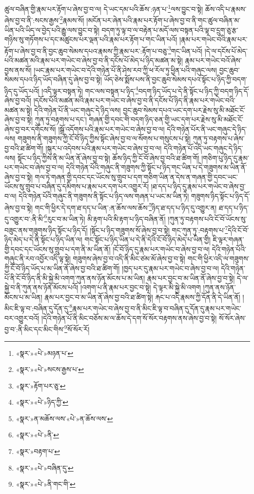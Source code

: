 ཚུལ་བཞིན་གྱི་རྣམ་པར་རྟོག་པ་ཞེས་བྱ་བ་ལ། དེ་ཡང་དམ་པའི་ཆོས་:ཉན་པ་\footnote{«སྣར་»«པེ་»མཉན་པ་}ལས་བྱུང་བ་སྟེ། ཆོས་འདི་པ་རྣམས་ཞེས་བྱ་བ་ནི་:སངས་རྒྱས་\footnote{«སྣར་»«པེ་»སངས་རྒྱས་པ་}རྣམས་སོ། །མངོན་པར་ཞེན་པའི་རྣམ་པར་རྟོག་པ་ཞེས་བྱ་བ་ནི་གང་ཚུལ་བཞིན་མ་ཡིན་པའི་ཡིད་ལ་བྱེད་པའི་རྒྱུ་ལས་བྱུང་བ་སྟེ། བདག་ཏུ་ལྟ་བ་ལ་བརྟེན་པ་མདོ་ལས་བསྟན་པའི་ལྟ་བ་དྲུག་ཅུ་རྩ་གཉིས་སུ་གཏོགས་པ་དང་མཚུངས་པར་ལྡན་པའི་རྣམ་པར་རྟོག་པ་གང་ཡིན་པའོ། །རྣམ་པར་གཡེང་བའི་རྣམ་པར་རྟོག་པ་ཞེས་བྱ་བ་ནི་བྱང་ཆུབ་སེམས་དཔའ་རྣམས་ཀྱི་རྣམ་པར་:རྟོག་པ་བཅུ་\footnote{«སྣར་»རྟོག་པར་ཅུ་}གང་ཡིན་པའོ། །དེ་ལ་དངོས་པོ་མེད་པའི་མཚན་མའི་རྣམ་པར་གཡེང་བ་ཞེས་བྱ་བ་ནི་དངོས་པོ་མེད་པ་ཉིད་མཚན་མ་སྟེ། རྣམ་པར་གཡེང་བའོ་ཞེས་བྱས་ནས་སོ། །ཡང་རྣམ་པར་གཡེང་བ་དེའི་གཉེན་པོ་ནི་ཤེས་རབ་ཀྱི་ཕ་རོལ་ཏུ་ཕྱིན་པའི་གཞུང་ལས། བྱང་ཆུབ་སེམས་དཔའ་ཉིད་ཡོད་བཞིན་དུ་ཞེས་བྱ་བ་སྟེ། ཡོད་ཅེས་སྨོས་པས་ནི་བྱང་ཆུབ་སེམས་དཔའ་སྟོང་པ་ཉིད་ཀྱི་བདག་ཉིད་དུ་ཡོད་པའོ། །འདི་ལྟར་བསྟན་ཏེ། གང་ལས་བསྟན་པ་ཉིད་\footnote{«སྣར་»«པེ་»ཉིད་ཀྱི་}བདག་ཉིད་ཡོད་པ་དེ་ནི་སྟོང་པ་ཉིད་ཀྱི་བདག་ཉིད་དོ་ཞེས་བྱ་བའོ། །དངོས་པོའི་མཚན་མའི་རྣམ་པར་གཡེང་བ་ཞེས་བྱ་བ་ནི་དངོས་པོ་ཉིད་ནི་རྣམ་པར་གཡེང་བའི་མཚན་མ་སྟེ། དེའི་གཉེན་པོ་ནི་ཡང་གཞུང་དེ་ཉིད་ལས། བྱང་ཆུབ་སེམས་དཔའ་ཡང་དག་པར་རྗེས་སུ་མི་མཐོང་ངོ་ཞེས་བྱ་བ་སྟེ། ཀུན་ཏུ་བརྟགས་པ་དང་། གཞན་གྱི་དབང་གི་བདག་ཉིད་ཅན་གྱི་ཡང་དག་པར་རྗེས་སུ་མི་མཐོང་ངོ་ཞེས་བྱ་བར་དགོངས་སོ། །སྒྲོ་འདོགས་པའི་རྣམ་པར་གཡེང་བ་ཞེས་བྱ་བ་ལ། དེའི་གཉེན་པོར་ནི་ཡང་གཞུང་དེ་ཉིད་ལས། གཟུགས་ནི་གཟུགས་ཀྱི་ངོ་བོ་ཉིད་ཀྱིས་སྟོང་ཞེས་བྱ་བ་ལ་སོགས་པ་གསུངས་པ་སྟེ། ཀུན་ཏུ་བརྟགས་པ་ཞེས་བྱ་བའི་ཐ་ཚིག་གོ། །སྐུར་པ་འདེབས་པའི་རྣམ་པར་གཡེང་བ་ཞེས་བྱ་བ་ལ། དེའི་གཉེན་པོ་འདི་ཡང་གཞུང་དེ་ཉིད་ལས། སྟོང་པ་ཉིད་ཀྱིས་ནི་མ་ཡིན་ནོ་ཞེས་བྱ་བ་སྟེ། ཆོས་ཉིད་ཀྱི་ངོ་བོ་ཞེས་བྱ་བའི་ཐ་ཚིག་གོ། །གཅིག་པུ་ཉིད་དུ་རྣམ་པར་གཡེང་བ་ཞེས་བྱ་བ་ལ། དེའི་གཉེན་པོའི་གཞུང་ནི་གཟུགས་ཀྱི་སྟོང་པ་ཉིད་གང་ཡིན་པ་དེ་གཟུགས་མ་ཡིན་ནོ་ཞེས་བྱ་བ་སྟེ། གལ་ཏེ་གཞན་གྱི་དབང་དང་ཡོངས་སུ་གྲུབ་པ་དག་གཅིག་ཡིན་ན་དེས་ན་གཞན་གྱི་དབང་ཡང་ཡོངས་སུ་གྲུབ་པ་བཞིན་དུ་དམིགས་པ་རྣམ་པར་དག་པར་འགྱུར་རོ། །ཐ་དད་པ་ཉིད་དུ་རྣམ་པར་གཡེང་བ་ཞེས་བྱ་བ་ལ། དེའི་གཉེན་པོའི་གཞུང་ནི་གཟུགས་ནི་སྟོང་པ་ཉིད་ལས་གཞན་པ་ཡང་མ་ཡིན་ཏེ། གཟུགས་ཉིད་སྟོང་པ་ཉིད་དོ་ཞེས་བྱ་བ་སྟེ། གང་གི་ཕྱིར་དེ་དག་ཐ་དད་པ་ཡིན་:ན་ཆོས་ལས་ཆོས་\footnote{«སྣར་»ན་མཆོས་ལས་«པེ་»ན་ཆོས་ལས་}ཉིད་ཐ་དད་པ་ཉིད་དུ་འགྱུར་ན། ཐ་དད་པ་ཉིད་དུ་འགྱུར་བ་:ནི་མི་\footnote{«སྣར་»«པེ་»ནི་}རུང་བ་མ་ཡིན་ཏེ། མི་རྟག་པའི་མི་རྟག་པ་ཉིད་བཞིན་ནོ། །ཀུན་ཏུ་བརྟགས་པའི་ངོ་བོ་ཡོངས་སུ་བཟུང་ནས་གཟུགས་ཉིད་སྟོང་པ་ཉིད་དོ། །སྟོང་པ་ཉིད་གཟུགས་སོ་ཞེས་བྱ་བ་སྟེ། གང་ཀུན་ཏུ་:བརྟགས་པ་\footnote{«སྣར་»བརྟག་པ་}དེའི་ངོ་བོ་ཉིད་མེད་པ་དེ་ནི་སྟོང་པ་ཉིད་ཡིན་ལ། གང་སྟོང་པ་ཉིད་ཡིན་པ་དེ་ནི་དེའི་ངོ་བོ་ཉིད་མེད་པ་ཡིན་གྱི། ཇི་ལྟར་གཞན་གྱི་དབང་དང་ཡོངས་སུ་གྲུབ་པ་དག་ནི་མ་ཡིན་ནོ། །ངོ་བོ་ཉིད་དུ་རྣམ་པར་གཡེང་བ་ཞེས་བྱ་བ་ལ། དེའི་གཉེན་པོའི་གཞུང་ནི་རབ་འབྱོར་འདི་ལྟ་སྟེ། གཟུགས་ཞེས་བྱ་བ་འདི་ནི་མིང་ཙམ་མོ་ཞེས་བྱ་བ་སྟེ། གང་གི་ཕྱིར་འདི་ལ་གཟུགས་ཀྱི་ངོ་བོ་ཉིད་ཡོད་པ་མ་ཡིན་ནོ་ཞེས་བྱ་བའི་ཐ་ཚིག་གོ། །ཁྱད་པར་དུ་རྣམ་པར་གཡེང་བ་ཞེས་བྱ་བ་ལ། དེའི་གཉེན་པོ་ནི་ངོ་བོ་ཉིད་ནི་མི་སྐྱེ་མི་འགག་ཀུན་ནས་ཉོན་མོངས་པ་མ་ཡིན། རྣམ་པར་བྱང་བ་མ་ཡིན་ནོ་ཞེས་བྱ་བ་སྟེ། དེ་ལ་སྐྱེ་བ་ནི་ཀུན་ནས་ཉོན་མོངས་པའོ། །འགག་པ་ནི་རྣམ་པར་བྱང་བ་སྟེ། དེ་ལྟར་མི་སྐྱེ་མི་འགག །ཀུན་ནས་ཉོན་མོངས་པ་མ་ཡིན། རྣམ་པར་བྱང་བ་མ་ཡིན་ནོ་ཞེས་བྱ་བའི་ཐ་ཚིག་སྟེ། རྐང་པ་འདི་རྣམས་ཀྱི་དོན་ནི་དེ་ཡིན་ནོ། །མིང་ཇི་ལྟ་བ་:བཞིན་དུ་དོན་དུ་\footnote{«སྣར་»«པེ་»བཞིན་དུ་}རྣམ་པར་གཡེང་བ་ཞེས་བྱ་བ་ནི་མིང་ཇི་ལྟ་བ་བཞིན་དུ་དོན་དུ་རྣམ་པར་གཡེང་བར་འགྱུར་བའོ། །དེའི་གཉེན་པོ་ནི་མིང་བཅོས་མ་ལ་ཆོས་དེ་དག་སོ་སོར་བརྟགས་ནས་ཞེས་བྱ་བ་སྟེ། སོ་སོར་ཞེས་བྱ་བ་:ནི་མིང་དང་མིང་གིས་\footnote{«སྣར་»«པེ་»ནི་གང་གི་}སོ་སོར་རོ། 